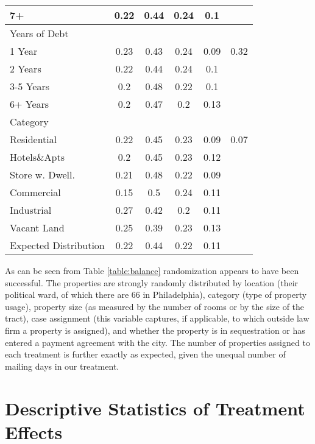 \documentclass[12pt,titlepage]{article}
\begin{document}
\begin{center}
\begin{longtable}{| l | c |  c| c| c| c|}
  7+ & 0.22 & 0.44 & 0.24 & 0.1 &  \\ 
   \hline
Years of Debt &  &  &  &  &  \\ 
  1 Year & 0.23 & 0.43 & 0.24 & 0.09 & 0.32 \\ 
  2 Years & 0.22 & 0.44 & 0.24 & 0.1 &  \\ 
  3-5 Years & 0.2 & 0.48 & 0.22 & 0.1 &  \\ 
  6+ Years & 0.2 & 0.47 & 0.2 & 0.13 &  \\ 
   \hline
Category &  &  &  &  &  \\ 
  Residential & 0.22 & 0.45 & 0.23 & 0.09 & 0.07 \\ 
  Hotels\&Apts & 0.2 & 0.45 & 0.23 & 0.12 &  \\ 
  Store w. Dwell. & 0.21 & 0.48 & 0.22 & 0.09 &  \\ 
  Commercial & 0.15 & 0.5 & 0.24 & 0.11 &  \\ 
  Industrial & 0.27 & 0.42 & 0.2 & 0.11 &  \\ 
  Vacant Land & 0.25 & 0.39 & 0.23 & 0.13 &  \\ 
   \hline
Expected Distribution & 0.22 & 0.44 & 0.22 & 0.11 &  \\ 
   \hline
\end{longtable}
\end{center}

 

As can be seen from Table \ref{table:balance} randomization appears to have been successful.
The properties are strongly randomly distributed by location (their
political ward, of which there are 66 in Philadelphia), category (type
of property usage), property size (as measured by the number of rooms
or by the size of the tract), case assignment (this variable captures,
if applicable, to which outside law firm a property is assigned), and
whether the property is in sequestration or has entered a payment
agreement with the city. The number of properties assigned to each
treatment is further exactly as expected, given the unequal number of
mailing days in our treatment.


\section{Descriptive Statistics of Treatment Effects}
\end{document}
